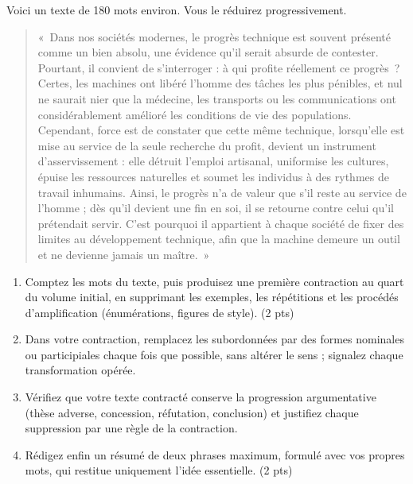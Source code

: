 \documentclass[11pt]{article}
\begin{document}
\begin{exercice}
Voici un texte de 180 mots environ. Vous le réduirez progressivement.

\begin{quote}
«~Dans nos sociétés modernes, le progrès technique est souvent présenté comme un bien absolu, une évidence qu'il serait absurde de contester. Pourtant, il convient de s'interroger : à qui profite réellement ce progrès~? Certes, les machines ont libéré l'homme des tâches les plus pénibles, et nul ne saurait nier que la médecine, les transports ou les communications ont considérablement amélioré les conditions de vie des populations. Cependant, force est de constater que cette même technique, lorsqu'elle est mise au service de la seule recherche du profit, devient un instrument d'asservissement : elle détruit l'emploi artisanal, uniformise les cultures, épuise les ressources naturelles et soumet les individus à des rythmes de travail inhumains. Ainsi, le progrès n'a de valeur que s'il reste au service de l'homme ; dès qu'il devient une fin en soi, il se retourne contre celui qu'il prétendait servir. C'est pourquoi il appartient à chaque société de fixer des limites au développement technique, afin que la machine demeure un outil et ne devienne jamais un maître.~»
\end{quote}

\begin{enumerate}
\item Comptez les mots du texte, puis produisez une première contraction au quart du volume initial, en supprimant les exemples, les répétitions et les procédés d'amplification (énumérations, figures de style). (2 pts)
\item Dans votre contraction, remplacez les subordonnées par des formes nominales ou participiales chaque fois que possible, sans altérer le sens ; signalez chaque transformation opérée.
\item Vérifiez que votre texte contracté conserve la progression argumentative (thèse adverse, concession, réfutation, conclusion) et justifiez chaque suppression par une règle de la contraction.
\item Rédigez enfin un résumé de deux phrases maximum, formulé avec vos propres mots, qui restitue uniquement l'idée essentielle. (2 pts)
\end{enumerate}
\end{exercice}
\end{document}
